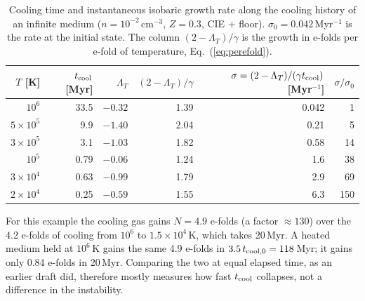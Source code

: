 \documentclass[11pt]{article}
\newcommand{\tcool}{t_{\rm cool}}
\newcommand{\LT}{\Lambda_T}
\begin{document}
\begin{table}[H]
\centering
\small
\caption{Cooling time and instantaneous isobaric growth rate along the cooling
history of an infinite medium ($n=10^{-2}$\,cm$^{-3}$, $Z=0.3$, CIE + floor).
$\sigma_0=0.042$\,Myr$^{-1}$ is the rate at the initial state. The column
$(2-\LT)/\gamma$ is the growth in e-folds per e-fold of temperature,
Eq.~(\ref{eq:perefold}).}
\label{tab:sigma}
\begin{tabular}{rrrrrr}
\toprule
$T$ [K] & $\tcool$ [Myr] & $\LT$ & $(2-\LT)/\gamma$ & $\sigma=(2-\LT)/(\gamma\tcool)$ [Myr$^{-1}$] & $\sigma/\sigma_0$ \\
\midrule
$10^6$            & 33.5  & $-0.32$ & 1.39 & 0.042 & 1 \\
$5\times10^5$     & 9.9   & $-1.40$ & 2.04 & 0.21  & 5 \\
$3\times10^5$     & 3.1   & $-1.03$ & 1.82 & 0.58  & 14 \\
$10^5$            & 0.79  & $-0.06$ & 1.24 & 1.6   & 38 \\
$3\times10^4$     & 0.63  & $-0.99$ & 1.79 & 2.9   & 69 \\
$2\times10^4$     & 0.25  & $-0.59$ & 1.55 & 6.3   & 150 \\
\bottomrule
\end{tabular}
\end{table}

For this example the cooling gas gains $N=4.9$ e-folds (a factor $\approx130$)
over the 4.2 e-folds of cooling from $10^6$ to $1.5\times10^4$\,K, which takes
20\,Myr. A heated medium held at $10^6$\,K gains the same 4.9 e-folds in
$3.5\,t_{\rm cool,0}=118$\,Myr; it gains only 0.84 e-folds in 20\,Myr. Comparing
the two at equal elapsed time, as an earlier draft did, therefore mostly measures
how fast $\tcool$ collapses, not a difference in the instability.
\end{document}
